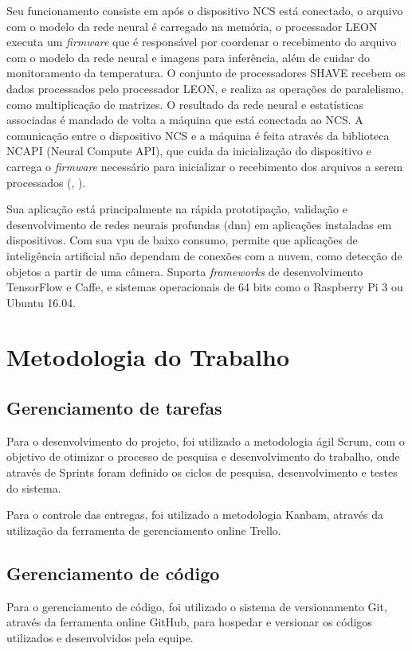\documentclass[]{politex}
\begin{document}
Seu funcionamento consiste em após o dispositivo NCS está conectado, o arquivo com o modelo da rede neural é carregado na memória, o processador LEON executa um \textit{firmware} que é responsável por coordenar o recebimento do arquivo com o modelo da rede neural e imagens para inferência, além de cuidar do monitoramento da temperatura. O conjunto de processadores SHAVE recebem os dados processados pelo processador LEON, e realiza as operações de paralelismo, como multiplicação de matrizes. O resultado da rede neural e estatísticas associadas é mandado de volta a máquina que está conectada ao NCS. A comunicação entre o dispositivo NCS e a máquina é feita através da biblioteca NCAPI (Neural Compute API), que cuida da inicialização do dispositivo e carrega o \textit{firmware} necessário para inicializar o recebimento dos arquivos a serem processados (, \citeyear{intel_movidius}).  

Sua aplicação está principalmente na rápida prototipação, validação e desenvolvimento de redes neurais profundas (\acrshort{dnn}) em aplicações instaladas em dispositivos. Com sua \acrshort{vpu} de baixo consumo, permite que aplicações de inteligência artificial não dependam de conexões com a nuvem, como detecção de objetos a partir de uma câmera. Suporta \textit{frameworks} de desenvolvimento TensorFlow e Caffe, e sistemas operacionais de 64 bits como o Raspberry Pi 3 ou Ubuntu 16.04.


\chapter{Metodologia do Trabalho}

\section{Gerenciamento de tarefas}
Para o desenvolvimento do projeto, foi utilizado a metodologia ágil Scrum, com o objetivo de otimizar o processo de pesquisa e desenvolvimento do trabalho, onde através de Sprints foram definido os ciclos de pesquisa, desenvolvimento e testes do sistema.

Para o controle das entregas, foi utilizado a metodologia Kanbam, através da utilização da ferramenta de gerenciamento online Trello.

\section{Gerenciamento de código}
Para o gerenciamento de código, foi utilizado o sistema de versionamento Git, através da ferramenta online GitHub, para hospedar e versionar os códigos utilizados e desenvolvidos pela equipe.
\end{document}
